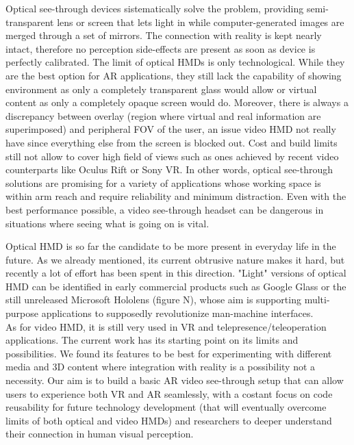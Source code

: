 Optical see-through devices sistematically solve the problem, providing semi-transparent lens or screen that lets light in while computer-generated images are merged through a set of mirrors. The connection with reality is kept nearly intact, therefore no perception side-effects are present as soon as device is perfectly calibrated. The limit of optical HMDs is only technological. While they are the best option for AR applications, they still lack the capability of showing environment as only a completely transparent glass would allow or virtual content as only a completely opaque screen would do. Moreover, there is always a discrepancy between overlay (region where virtual and real information are superimposed) and peripheral FOV of the user, an issue video HMD not really have since everything else from the screen is blocked out. Cost and build limits still not allow to cover high field of views such as ones achieved by recent video counterparts like Oculus Rift or Sony VR. In other words, optical see-through solutions are promising for a variety of applications whose working space is within arm reach and require reliability and minimum distraction. Even with the best performance possible, a video see-through headset can be dangerous in situations where seeing what is going on is vital.

Optical HMD is so far the candidate to be more present in everyday life in the future. As we already mentioned, its current obtrusive nature makes it hard, but recently a lot of effort has been spent in this direction. "Light" versions of optical HMD can be identified in early commercial products such as Google Glass or the still unreleased Microsoft Hololens (figure N), whose aim is supporting multi-purpose applications to supposedly revolutionize man-machine interfaces.\\
As for video HMD, it is still very used in VR and telepresence/teleoperation applications. The current work has its starting point on its limits and possibilities. We found its features to be best for experimenting with different media and 3D content where integration with reality is a possibility not a necessity. Our aim is to build a basic AR video see-through setup that can allow users to experience both VR and AR seamlessly, with a costant focus on code reusability for future technology development (that will eventually overcome limits of both optical and video HMDs) and researchers to deeper understand their connection in human visual perception.


